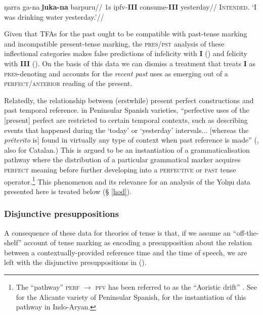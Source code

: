 \documentclass[11pt,dvipsnames]{report}
\begin{document}
\a{}\begingl\gla ŋarra ga-na \textbf{ḻuka-na} barpuru//
\glb 1s \gls{ipfv}-\textbf{III} consume-\textbf{III} yesterday//
\glft\textsc{Intended.} `I was drinking water yesterday.'\trailingcitation{[DhG~20190405]}//\endgl


\xe

Given that TFAs for the past ought to be compatible with past-tense marking and incompatible present-tense marking, the \textsc{pres/pst} analysis of these inflectional categories makes false predictions of infelicity with \textbf{I}  () and felicity with \textbf{III} (). On the basis of this data we can dismiss a treatment that treats \textbf{I} as \textsc{pres}-denoting and accounts for the \textit{recent past} uses as emerging out of a \textsc{perfect/anterior} reading of the present.

Relatedly, the relationship between (erstwhile) present perfect constructions and past temporal reference. in Peninsular Spanish varieties, ``perfective uses of the [present] perfect are restricted to certain temporal contexts, such as describing events that happened during the `today' or `yesterday' intervals... [whereas the \textit{préterito} is] found in virtually any type of context when past reference is made'' (\citealp[72]{Howe2006}, also \citealp[115ff]{CurelliGotor1990} for Catalan.) This is argued to be an instantiation of a grammaticalisation pathway where the distribution of a particular grammatical marker acquires \textsc{perfect} meaning before further developing into a \textsc{perfective} or \textsc{past} tense operator.\footnote{The ``pathway'' \textsc{perf $ \to $ pfv} has been referred to as the ``Aoristic drift'' \citep{Schaden2009,Schaden2012}. See \citep{Schwenter1994} for the Alicante variety of Peninsular Spanish, \citep{Condoravdi2014} for the instantiation of this pathway in Indo-Aryan.} This phenomenon and its relevance for an analysis of the Yolŋu data presented here is treated below (§ \ref{hod}).





\subsubsection{Disjunctive presuppositions}
A consequence of these data for theories of tense is that, if we assume an ``off-the-shelf'' account of tense marking as encoding a presupposition about the relation between a contextually-provided reference time and the time of speech, we are left with the disjunctive presuppositions in (\nextx).
\end{document}
